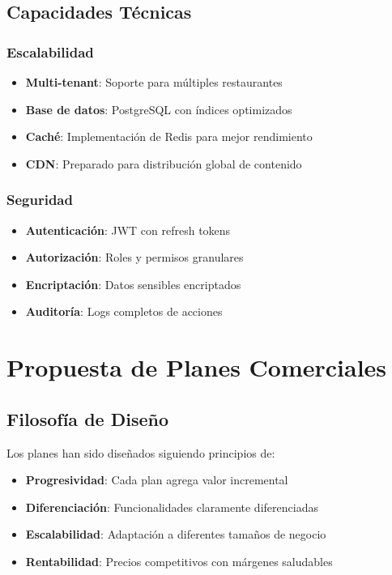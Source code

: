 \documentclass[12pt,a4paper]{article}
\begin{document}
\subsection{Capacidades Técnicas}

\subsubsection{Escalabilidad}

\begin{itemize}
    \item \textbf{Multi-tenant}: Soporte para múltiples restaurantes
    \item \textbf{Base de datos}: PostgreSQL con índices optimizados
    \item \textbf{Caché}: Implementación de Redis para mejor rendimiento
    \item \textbf{CDN}: Preparado para distribución global de contenido
\end{itemize}

\subsubsection{Seguridad}

\begin{itemize}
    \item \textbf{Autenticación}: JWT con refresh tokens
    \item \textbf{Autorización}: Roles y permisos granulares
    \item \textbf{Encriptación}: Datos sensibles encriptados
    \item \textbf{Auditoría}: Logs completos de acciones
\end{itemize}

\section{Propuesta de Planes Comerciales}

\subsection{Filosofía de Diseño}

Los planes han sido diseñados siguiendo principios de:

\begin{itemize}
    \item \textbf{Progresividad}: Cada plan agrega valor incremental
    \item \textbf{Diferenciación}: Funcionalidades claramente diferenciadas
    \item \textbf{Escalabilidad}: Adaptación a diferentes tamaños de negocio
    \item \textbf{Rentabilidad}: Precios competitivos con márgenes saludables
\end{itemize}
\end{document}

